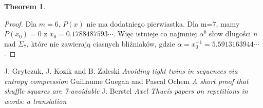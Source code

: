 \documentclass[11pt,a4paper]{article}
\theoremstyle{definition}
\newtheorem{theorem}{Theorem}[section]
\begin{document}
\begin{theorem}
\begin{proof}
Dla $m=6$, $P(x)$ nie ma dodatniego pierwiastka. Dla m=7, mamy $P(x_0)=0$ z $x_0=0.1788487593\cdots$. Więc istnieje co najmniej $\alpha^b$ słow długości $n$ nad $\Sigma_7$, które nie zawierają ciasnych bliźniaków, gdzie $\alpha = x_0^{-1} = 5.5913163944\cdots$.

\end{proof}
\end{theorem}

\begin{thebibliography}{4}
%
J. Grytczuk, J. Kozik and B. Zaleski
\textsl{Avoiding tight twins in sequences via
entropy compression}
Guillaume Guegan and Pascal Ochem
\textsl{A short proof that shuffle squares are
7-avoidable}
J. Berstel
\textsl{Axel Thueís papers on repetitions in words: a translation}
\end{thebibliography}
\end{document}
